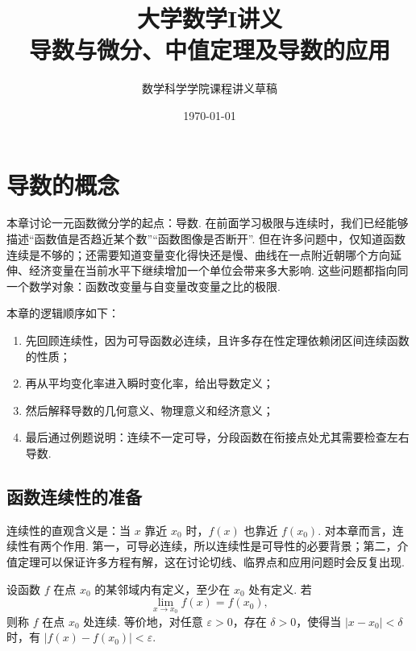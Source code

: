 \documentclass[fontset=fandol]{ctexart}
\title{大学数学I讲义\\导数与微分、中值定理及导数的应用}
\author{数学科学学院课程讲义草稿}
\date{\today}
\newcounter{DefinitionCounter}[section]
\newcounter{TheoremCounter}[section]
\newcounter{PropositionCounter}[section]
\newcounter{ExampleCounter}[section]
\newcounter{ExerciseCounter}[section]
\newcommand{\renewEnvironmentCounter}{\setcounter{DefinitionCounter}{0}\setcounter{TheoremCounter}{0}\setcounter{PropositionCounter}{0}\setcounter{ExampleCounter}{0}\setcounter{ExerciseCounter}{0}}
\begin{document}
\maketitle
\vspace{-1em}

\renewcommand{\contentsname}{\hspace*{\fill}\Large\bfseries 目\quad 录 \hspace*{\fill}}
\setcounter{tocdepth}{2}
\tableofcontents
\clearpage

\section{导数的概念}
\renewEnvironmentCounter

本章讨论一元函数微分学的起点：导数. 在前面学习极限与连续时，我们已经能够描述“函数值是否趋近某个数”“函数图像是否断开”. 但在许多问题中，仅知道函数连续是不够的；还需要知道变量变化得快还是慢、曲线在一点附近朝哪个方向延伸、经济变量在当前水平下继续增加一个单位会带来多大影响. 这些问题都指向同一个数学对象：函数改变量与自变量改变量之比的极限.

本章的逻辑顺序如下：
\begin{enumerate}[label=(\arabic*),leftmargin=2em]
\item 先回顾连续性，因为可导函数必连续，且许多存在性定理依赖闭区间连续函数的性质；
\item 再从平均变化率进入瞬时变化率，给出导数定义；
\item 然后解释导数的几何意义、物理意义和经济意义；
\item 最后通过例题说明：连续不一定可导，分段函数在衔接点处尤其需要检查左右导数.
\end{enumerate}

\subsection{函数连续性的准备}

连续性的直观含义是：当 $x$ 靠近 $x_0$ 时，$f(x)$ 也靠近 $f(x_0)$. 对本章而言，连续性有两个作用. 第一，可导必连续，所以连续性是可导性的必要背景；第二，介值定理可以保证许多方程有解，这在讨论切线、临界点和应用问题时会反复出现.

\begin{definition}[函数在一点连续]
设函数 $f$ 在点 $x_0$ 的某邻域内有定义，至少在 $x_0$ 处有定义. 若
\[
\lim_{x\to x_0}f(x)=f(x_0),
\]
则称 $f$ 在点 $x_0$ 处连续. 等价地，对任意 $\varepsilon>0$，存在 $\delta>0$，使得当 $|x-x_0|<\delta$ 时，有 $|f(x)-f(x_0)|<\varepsilon$.
\end{definition}
\end{document}
